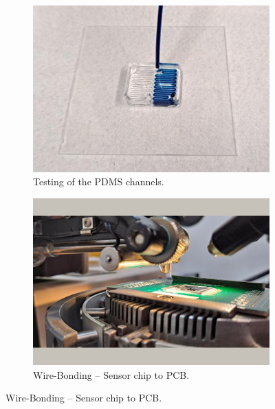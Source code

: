 \begin{figure}[!ht]
    \centering
    \begin{subfigure}[b]{.475\linewidth}
        \centering
        \includegraphics[width=\linewidth]{images/appendix_b/test.png}
        \caption{Testing of the PDMS channels.}
        \label{figure:mf-test}
    \end{subfigure}
    \hfill
    \centering
    \begin{subfigure}[b]{.475\linewidth}
        \centering
        \includegraphics[width=\linewidth]{images/appendix_b/wirebonding.png}
        \caption{Wire-Bonding -- Sensor chip to PCB.}
        \label{figure:mf-wbonding}
    \end{subfigure}

    \bigskip
    

\end{figure}
